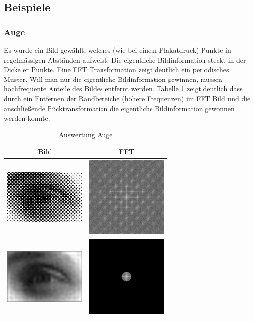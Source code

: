 \documentclass[12pt,german]{article}
\begin{document}
\subsection{Beispiele}

\subsubsection{Auge}
Es wurde ein Bild gewählt, welches (wie bei einem Plakatdruck) Punkte in regelmässigen Abständen aufweist. Die eigentliche Bildinformation steckt in der Dicke er Punkte. Eine FFT Transformation zeigt deutlich ein periodisches Muster. Will man nur die eigentliche Bildinformation gewinnen, müssen hochfrequente Anteile des Bildes entfernt werden. Tabelle \ref{tab:AuswertungAuge} zeigt deutlich dass durch ein Entfernen der Randbereiche (höhere Frequenzen) im FFT Bild und die anschließende Rücktransformation die eigentliche Bildinformation gewonnen werden konnte.
\begin{table}[h]
  \centering
  \begin{tabular}{c | c}
    \hline
    Bild & FFT \\
    \hline
	\includegraphics[width=4cm]{../testData/Auge.jpg} & \includegraphics[width=4cm]{../testData/Results/Auge/FFT_of_Auge.jpg} \\
    \hline
    \includegraphics[width=4cm]{../testData/Results/Auge/reduced_Auge.jpg} & \includegraphics[width=4cm]{../testData/Results/Auge/reduced_FFT_of_Auge.jpg} \\
  \end{tabular}
  \caption{Auswertung Auge}
  \label{tab:AuswertungAuge}
\end{table}
\end{document}
